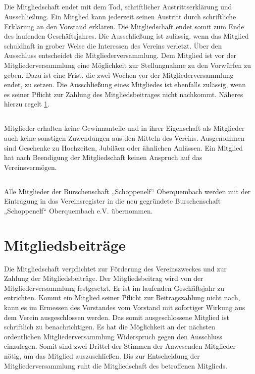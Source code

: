 	\subsection{} Die Mitgliedschaft endet mit dem Tod, schriftlicher Austrittserklärung und Ausschließung. Ein Mitglied kann jederzeit seinen Austritt durch schriftliche Erklärung an den Vorstand erklären. Die Mitgliedschaft endet somit zum Ende des laufenden Geschäftsjahres. 
	Die Ausschließung ist zulässig, wenn das Mitglied schuldhaft in grober Weise die Interessen des Vereins verletzt. Über den Ausschluss entscheidet die Mitgliederversammlung. Dem Mitglied ist vor der Mitgliederversammlung eine Möglichkeit zur Stellungnahme zu den Vorwürfen zu geben. Dazu ist eine Frist, die zwei Wochen vor der Mitgliederversammlung endet, zu setzen. Die Ausschließung eines Mitgliedes ist ebenfalls zulässig, wenn es seiner Pflicht zur Zahlung des Mitgliedsbeitrages nicht nachkommt. Näheres hierzu regelt \ref{14}.
	
	\subsection{} Mitglieder erhalten keine Gewinnanteile und in ihrer Eigenschaft als Mitglieder auch keine sonstigen Zuwendungen aus den Mitteln des Vereins. Ausgenommen sind Geschenke zu Hochzeiten, Jubiläen oder ähnlichen Anlässen. Ein Mitglied hat nach Beendigung der Mitgliedschaft keinen Anspruch auf das Vereinsvermögen. 
	
	\subsection{} Alle Mitglieder der Burschenschaft „Schoppenelf“ Oberquembach werden mit der Eintragung in das Vereinsregister in die neu gegründete Burschenschaft „Schoppenelf“ Oberquembach e.V. übernommen.

\section{Mitgliedsbeiträge}	\label{14}
Die Mitgliedschaft verpflichtet zur Förderung des Vereinszweckes und zur Zahlung der Mitgliedsbeiträge. Der Mitgliedsbeitrag wird von der Mitgliederversammlung festgesetzt.
Er ist im laufenden Geschäftsjahr zu entrichten. Kommt ein Mitglied seiner Pflicht zur Beitragszahlung nicht nach, kann es im Ermessen des Vorstandes vom Vorstand mit sofortiger Wirkung aus dem Verein ausgeschlossen werden. Das somit ausgeschlossene Mitglied ist schriftlich zu benachrichtigen. Es hat die Möglichkeit an der nächsten ordentlichen Mitgliederversammlung Widerspruch gegen den Ausschluss einzulegen. Somit sind zwei Drittel der Stimmen der Anwesenden Mitglieder nötig, um das Mitglied auszuschließen. Bis zur Entscheidung der Mitgliederversammlung ruht die Mitgliedschaft des betroffenen Mitglieds. 

